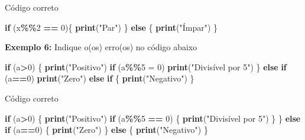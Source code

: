 \documentclass[
]{book}
\newenvironment{Shaded}{\begin{snugshade}}{\end{snugshade}}
\newcommand{\ControlFlowTok}[1]{\textcolor[rgb]{0.13,0.29,0.53}{\textbf{#1}}}
\newcommand{\DecValTok}[1]{\textcolor[rgb]{0.00,0.00,0.81}{#1}}
\newcommand{\FunctionTok}[1]{\textcolor[rgb]{0.13,0.29,0.53}{\textbf{#1}}}
\newcommand{\NormalTok}[1]{#1}
\newcommand{\OtherTok}[1]{\textcolor[rgb]{0.56,0.35,0.01}{#1}}
\newcommand{\SpecialCharTok}[1]{\textcolor[rgb]{0.81,0.36,0.00}{\textbf{#1}}}
\newcommand{\StringTok}[1]{\textcolor[rgb]{0.31,0.60,0.02}{#1}}
\begin{document}
Código correto

\begin{Shaded}
\begin{Highlighting}[]
\ControlFlowTok{if}\NormalTok{ (x}\SpecialCharTok{\%\%}\DecValTok{2} \SpecialCharTok{==} \DecValTok{0}\NormalTok{)\{  }
  \FunctionTok{print}\NormalTok{(}\StringTok{"Par"}\NormalTok{)}
\NormalTok{\} }\ControlFlowTok{else}\NormalTok{ \{  }
    \FunctionTok{print}\NormalTok{(}\StringTok{"Ímpar"}\NormalTok{)}
\NormalTok{\}}
\end{Highlighting}
\end{Shaded}

\textbf{Exemplo 6:} Indique o(os) erro(os) no código abaixo

\begin{Shaded}
\begin{Highlighting}[]
\ControlFlowTok{if}\NormalTok{ (a}\SpecialCharTok{\textgreater{}}\DecValTok{0}\NormalTok{) \{  }
  \FunctionTok{print}\NormalTok{(}\StringTok{"Positivo"}\NormalTok{)  }
  \ControlFlowTok{if}\NormalTok{ (a}\SpecialCharTok{\%\%}\DecValTok{5} \OtherTok{=} \DecValTok{0}\NormalTok{)     }
    \FunctionTok{print}\NormalTok{(}\StringTok{"Divisível por 5"}\NormalTok{)    }
\NormalTok{\} }\ControlFlowTok{else} \ControlFlowTok{if}\NormalTok{ (a}\SpecialCharTok{==}\DecValTok{0}\NormalTok{)   }
    \FunctionTok{print}\NormalTok{(}\StringTok{"Zero"}\NormalTok{)}
  \ControlFlowTok{else} \ControlFlowTok{if}\NormalTok{ \{  }
    \FunctionTok{print}\NormalTok{(}\StringTok{"Negativo"}\NormalTok{)}
\NormalTok{\}}
\end{Highlighting}
\end{Shaded}

Código correto

\begin{Shaded}
\begin{Highlighting}[]
\ControlFlowTok{if}\NormalTok{ (a}\SpecialCharTok{\textgreater{}}\DecValTok{0}\NormalTok{) \{  }
  \FunctionTok{print}\NormalTok{(}\StringTok{"Positivo"}\NormalTok{)  }
  \ControlFlowTok{if}\NormalTok{ (a}\SpecialCharTok{\%\%}\DecValTok{5} \SpecialCharTok{==} \DecValTok{0}\NormalTok{) \{    }
    \FunctionTok{print}\NormalTok{(}\StringTok{"Divisível por 5"}\NormalTok{)  }
\NormalTok{  \}}
\NormalTok{\} }\ControlFlowTok{else} \ControlFlowTok{if}\NormalTok{ (a}\SpecialCharTok{==}\DecValTok{0}\NormalTok{) \{  }
    \FunctionTok{print}\NormalTok{(}\StringTok{"Zero"}\NormalTok{)}
\NormalTok{\} }\ControlFlowTok{else}\NormalTok{ \{  }
    \FunctionTok{print}\NormalTok{(}\StringTok{"Negativo"}\NormalTok{)}
\NormalTok{\}}
\end{Highlighting}
\end{Shaded}
\end{document}
